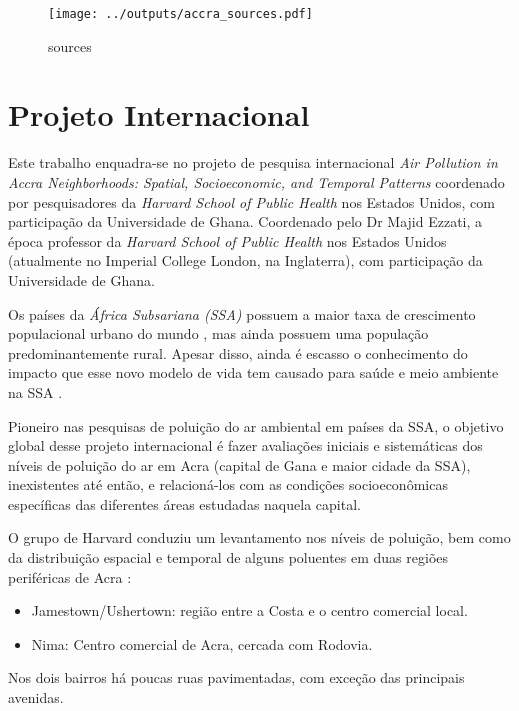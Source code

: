 
\begin{figure}[H]
\begin{center}
  \texttt{[image: ../outputs/accra\_sources.pdf]}
  \caption{sources}
\end{center}
\end{figure}


\section{Projeto Internacional}

Este trabalho enquadra-se no projeto de pesquisa internacional 
\textit{Air Pollution in Accra Neighborhoods: Spatial, Socioeconomic, and Temporal Patterns} 
coordenado por pesquisadores da \textit{Harvard School of Public Health} nos Estados Unidos, 
com participação da Universidade de Ghana. 
Coordenado pelo Dr Majid Ezzati, a época professor da \textit{Harvard School of Public Health} 
nos Estados Unidos (atualmente no Imperial College London, na Inglaterra), com participação 
da Universidade de Ghana. 

Os países da \textit{África Subsariana (SSA)} possuem a maior taxa de crescimento 
populacional urbano do mundo \cite{united2006world}, mas ainda possuem uma população 
predominantemente rural. 
Apesar disso, ainda é escasso o conhecimento do impacto que esse novo modelo de vida 
tem causado para saúde e meio ambiente na SSA \cite{cohen2004urban}. 

Pioneiro nas pesquisas de poluição do ar ambiental em países da SSA, o objetivo 
global desse projeto internacional é fazer avaliações iniciais e sistemáticas 
dos níveis de poluição do ar em Acra (capital de Gana e maior cidade da SSA), 
inexistentes até então, e relacioná-los com as condições socioeconômicas 
específicas das diferentes áreas estudadas naquela capital.

O grupo de Harvard \citep{ARKU2008} conduziu um levantamento nos níveis de 
poluição, bem como da distribuição espacial e temporal de alguns poluentes 
em duas regiões periféricas de Acra \citep{DIONISIO2010}:



\begin{itemize}
  \item Jamestown/Ushertown: região entre a Costa e o centro comercial local.
  \item Nima: Centro comercial de Acra, cercada com Rodovia.
\end{itemize} 

Nos dois bairros há poucas ruas pavimentadas, com exceção das principais 
avenidas.
